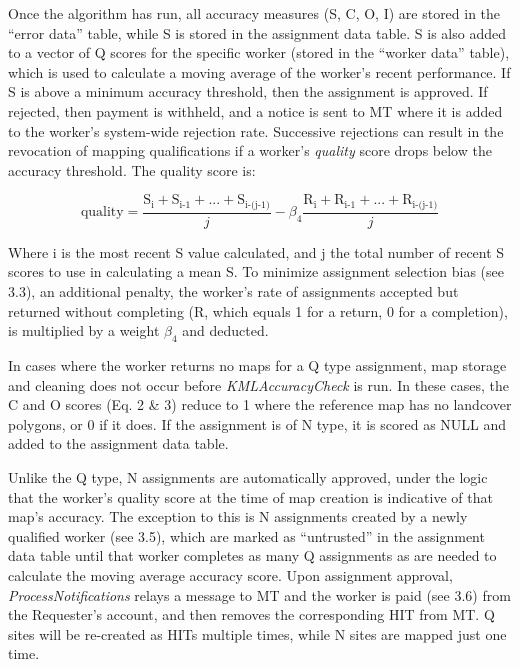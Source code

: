 \documentclass[preprint,12pt,authoryear]{elsarticle}
\begin{document}
Once the algorithm has run, all accuracy measures (S, C, O, I) are stored in the ``error data'' table, while S is stored in the assignment data table. S is also added to a vector of Q scores for the specific worker (stored in the ``worker data'' table), which is used to calculate a moving average of the worker's recent performance.  If S is above a minimum accuracy threshold, then the assignment is approved. If rejected, then payment is withheld, and a notice is sent to MT where it is added to the worker's system-wide rejection rate. Successive rejections can result in the revocation of mapping qualifications if a worker's \emph{quality} score drops below the accuracy threshold. The quality score is:

\begin{equation}
  \textrm{quality} = \frac{{\textrm{S}_{\textrm{i}} + \textrm{S}_{\textrm{i-1}} + ... + \textrm{S}_\textrm{i-(j-1)}}}{j} - \beta_4\frac{{\textrm{R}_{\textrm{i}} + \textrm{R}_{\textrm{i-1}} + ... + \textrm{R}_\textrm{i-(j-1)}}}{j}
\end{equation}

Where i is the most recent S value calculated, and j the total number of recent S scores to use in calculating a mean S. To minimize assignment selection bias (see 3.3), an additional penalty, the worker's rate of assignments accepted but returned without completing (R, which equals 1 for a return, 0 for a completion), is multiplied by a weight $\beta_4$ and deducted.  

In cases where the worker returns no maps for a Q type assignment, map storage and cleaning does not occur before \emph{KMLAccuracyCheck} is run. In these cases, the C and O scores (Eq. 2 \& 3) reduce to 1 where the reference map has no landcover polygons, or 0 if it does. If the assignment is of N type, it is scored as NULL and added to the assignment data table.  

Unlike the Q type, N assignments are automatically approved, under the logic that the worker's quality score at the time of map creation is indicative of that map's accuracy. The exception to this is N assignments created by a newly qualified worker (see 3.5), which are marked as ``untrusted'' in the assignment data table until that worker completes as many Q assignments as are needed to calculate the moving average accuracy score. Upon assignment approval, \emph{ProcessNotifications} relays a message to MT and the worker is paid (see 3.6) from the Requester's account, and then removes the corresponding HIT from MT. Q sites will be re-created as HITs multiple times, while N sites are mapped just one time.
\end{document}
